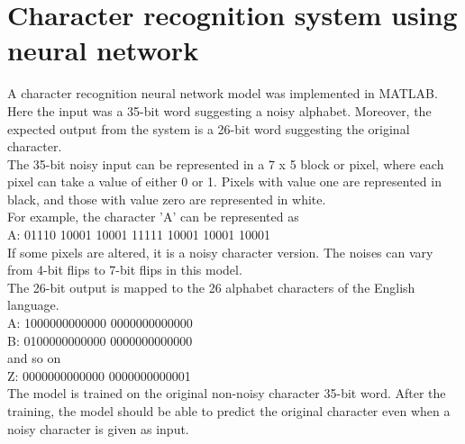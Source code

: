 \documentclass[12pt,a4paper,bold]{thesis}
\theoremstyle{thm}
\theoremstyle{definition}
\begin{document}
\section{Character recognition system using neural network}
\indent\indent A character recognition neural network model was implemented in MATLAB. Here the input was a 35-bit word suggesting a noisy alphabet. Moreover, the expected output from the system is a 26-bit word suggesting the original character.\\
\indent The 35-bit noisy input can be represented in a 7 x 5 block or pixel, where each pixel can take a value of either 0 or 1. Pixels with value one are represented in black, and those with value zero are represented in white.\\
For example, the character 'A' can be represented as\\ 
A: 01110 10001 10001 11111 10001 10001 10001\\
If some pixels are altered, it is a noisy character version. The noises can vary from 4-bit flips to 7-bit flips in this model.\\
The 26-bit output is mapped to the 26 alphabet characters of the English language.\\
A: 1000000000000 0000000000000\\
B: 0100000000000 0000000000000\\
and so on\\
Z: 0000000000000 0000000000001\\
The model is trained on the original non-noisy character 35-bit word. After the training, the model should be able to predict the original character even when a noisy character is given as input.
\pagebreak
\end{document}
